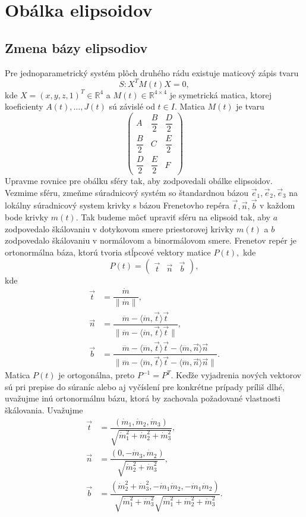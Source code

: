 \section{Obálka elipsoidov}
\subsection{Zmena bázy elipsodiov}
Pre jednoparametrický systém plôch druhého rádu existuje maticový zápis tvaru 
$$
S: X^TM(t)X = 0,
$$
kde $ X = (x, y, z, 1)^T \in \mathbb{R}^4$ a $M(t) \in \mathbb{R}^{4 \times 4} $ je symetrická matica, ktorej koeficienty $A(t), \dots, J(t)$ sú závislé od $t \in I$. Matica $M(t)$ je tvaru
$$
\left(\begin{matrix} 
A & \dfrac{B}{2} & \dfrac{D}{2} \\
\dfrac{B}{2} & C & \dfrac{E}{2} \\
\dfrac{D}{2} & \dfrac{E}{2} & F 
\end{matrix} \right)
$$
Upravme rovnice pre obálku sféry tak, aby zodpovedali obálke elipsoidov. Vezmime sféru, zmeňme súradnicový systém so štandardnou bázou  $\vec{e}_1, \vec{e}_2, \vec{e}_3$ na lokálny súradnicový system krivky s bázou Frenetovho repéra $\vec{t}, \vec{n}, \vec{b}$ v každom bode krivky $m(t).$ Tak budeme môcť upraviť sféru na elipsoid tak, aby $a$ zodpovedalo škálovaniu v dotykovom smere priestorovej krivky $m(t)$ a $b$ zodpovedalo škálovaniu v normálovom a binormálovom smere. Frenetov repér je ortonormálna báza, ktorú tvoria stĺpcové vektory matice $P(t),$ kde
$$
P(t) = \left( \begin{matrix} \vec{t} & \vec{n} & \vec{b} \end{matrix} \right),
$$
kde
\begin{align*}
\vec{t} &= \dfrac{\dot{m}}{\| \dot{m} \|}, \\
\vec{n} &= \dfrac{\ddot{m} - \langle \ddot{m}, \vec{t} \rangle \vec{t}}{\| \ddot{m} - \langle \ddot{m}, \vec{t} \rangle \vec{t}\| }, \\
\vec{b} &= \dfrac{\dddot{m} - \langle \dddot{m}, \vec{t} \rangle \vec{t} - \langle \dddot{m}, \vec{n} \rangle \vec{n}}{\| \dddot{m} - \langle \dddot{m}, \vec{t} \rangle \vec{t} - \langle \dddot{m}, \vec{n} \rangle \vec{n} \| }.
\end{align*}
Matica $P(t)$ je ortogonálna, preto $P^{-1} = P^T.$
Keďže vyjadrenia nových vektorov sú pri prepise do súraníc alebo aj vyčíslení pre konkrétne prípady príliš dlhé, uvažujme inú ortonormálnu bázu, ktorá by zachovala požadované vlastnosti škálovania. Uvažujme
\begin{align*}
\vec{t} &= \dfrac{(\dot{m}_1, \dot{m}_2, \dot{m}_3)}{\sqrt{\dot{m}_1^2 + \dot{m}_2^2 + \dot{m}_3^2}}, \\
\vec{n} &= \dfrac{(0, -\dot{m}_3, \dot{m}_2)}{\sqrt{\dot{m}_2^2 + \dot{m}_3^2}}, \\
\vec{b} &= \dfrac{(\dot{m}_2^2 + \dot{m}_3^2, -\dot{m}_1 \dot{m}_2, -\dot{m}_1 \dot{m}_2)}{\sqrt{\dot{m}_1^2 + \dot{m}_3^2}\sqrt{\dot{m}_1^2 + \dot{m}_2^2 + \dot{m}_3^2}}.
\end{align*}
